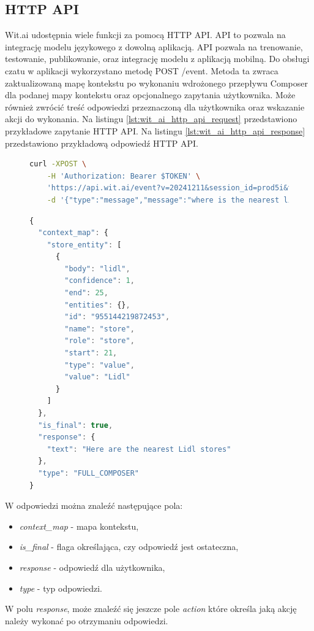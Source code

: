\subsection{HTTP API}
Wit.ai udostępnia wiele funkcji za pomocą HTTP API. API to pozwala na integrację modelu językowego z dowolną aplikacją. API pozwala na trenowanie, testowanie, publikowanie, oraz integrację modelu z aplikacją mobilną. Do obsługi czatu w aplikacji wykorzystano metodę POST /event. Metoda ta zwraca zaktualizowaną mapę kontekstu po wykonaniu wdrożonego przepływu Composer dla podanej mapy kontekstu oraz opcjonalnego zapytania użytkownika. Może również zwrócić treść odpowiedzi przeznaczoną dla użytkownika oraz wskazanie akcji do wykonania. \cite{witai_http_api} Na listingu \ref{lst:wit_ai_http_api_request} przedstawiono przykładowe zapytanie HTTP API.
Na listingu \ref{lst:wit_ai_http_api_response} przedstawiono przykładową odpowiedź HTTP API.

\begin{figure}[H]
\begin{lstlisting}[language=bash, caption=Przykładowe zapytanie HTTP API, label=lst:wit_ai_http_api_request]
    curl -XPOST \
    -H 'Authorization: Bearer $TOKEN' \
    'https://api.wit.ai/event?v=20241211&session_id=prod5i&tag=1.0&context_map=%7B%7D' \
    -d '{"type":"message","message":"where is the nearest lidl?"}'  
\end{lstlisting}
\end{figure}
\label{lst:wit_ai_http_api_request}

\begin{figure}[H]
\begin{lstlisting}[language=javascript, caption=Przykładowe zapytanie HTTP API, label=lst:wit_ai_http_api_request]
{
  "context_map": {
    "store_entity": [
      {
        "body": "lidl",
        "confidence": 1,
        "end": 25,
        "entities": {},
        "id": "955144219872453",
        "name": "store",
        "role": "store",
        "start": 21,
        "type": "value",
        "value": "Lidl"
      }
    ]
  },
  "is_final": true,
  "response": {
    "text": "Here are the nearest Lidl stores"
  },
  "type": "FULL_COMPOSER"
}
\end{lstlisting}
\end{figure}
\label{lst:wit_ai_http_api_response}

W odpowiedzi można znaleźć następujące pola:
\begin{itemize}
    \item \textit{context\_map} - mapa kontekstu,
    \item \textit{is\_final} - flaga określająca, czy odpowiedź jest ostateczna,
    \item \textit{response} - odpowiedź dla użytkownika,
    \item \textit{type} - typ odpowiedzi.
\end{itemize}
W polu \textit{response}, może znaleźć się jeszcze pole \textit{action} które określa jaką akcję należy wykonać po otrzymaniu odpowiedzi.

